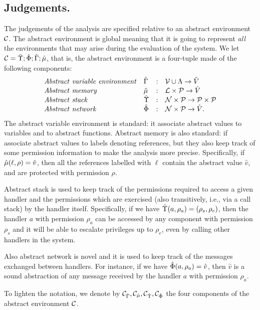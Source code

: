 \subsection{Judgements.}  The judgements of the analysis are specified
relative to an abstract environment ${\cal C}$. The abstract environment
is global meaning that it is going to represent \emph{all} the
environments that may arise during the evaluation of the system.
We let ${\cal C}=\hat{\Upsilon} ; \hat{\Phi} ; \hat{\Gamma} ; \hat{\mu}$, that is, the 
abstract environment is a four-tuple made of the following components:
\[
\begin{array}{llcl}
\mathit{Abstract\ variable\ environment} & \hat{\Gamma} & : & \mathcal{V} \cup \Lambda \rightarrow \hat{V} \\
\mathit{Abstract\ memory} & \hat{\mu} & : & {\mathcal L} \times \mathcal{P} \rightarrow \hat{V} \\
\mathit{Abstract\ stack} & \hat{\Upsilon} & : & \mathcal{N} \times \mathcal{P} \rightarrow \mathcal{P} \times \mathcal{P} \\
\mathit{Abstract\ network} & \hat{\Phi} & : & \mathcal{N} \times \mathcal{P} \rightarrow \hat{V}.
\end{array}
\]
The abstract variable environment is standard: it associate abstract values to
variables and to abstract functions. 
Abstract memory is also standard: if associate abstract
values to labels denoting references, but they also keep track of some permission
information to make the analysis more precise. Specifically, 
if $\hat{\mu}(\ell,\rho) = \hat{v}$, then all the references
labelled with $\ell$ contain the abstract value $\hat{v}$, and are protected with permission $\rho$.

Abstract stack is used to keep track of the permissions required to 
access a given handler and the permissions which are exercised 
(also transitively, i.e., via a call stack) by the handler itself. 
Specifically, if we have $\hat{\Upsilon}(a,\rho_a) =
(\rho_s,\rho_e)$, then the handler $a$ with permission $\rho_a$ can be
accessed by any component with permission $\rho_s$ and it will be
able to escalate privileges up to $\rho_e$, even by calling other handlers 
in the system.

Also abstract network is novel and it is used to keep track of the
messages exchanged between handlers. For instance, if we have
$\hat{\Phi}(a,\rho_a) = \hat{v}$, then $\hat{v}$ is a sound abstraction
of any message received by the handler $a$ with permission $\rho_a$. 

To lighten the notation, we denote by ${\cal C}_{\hat{\Gamma}}, {\cal C}_{\hat{\mu}},
{\cal C}_{\hat{\Upsilon}}, {\cal C}_{\hat{\Phi}}$ the four components of the abstract 
environment ${\cal C}$.
 
